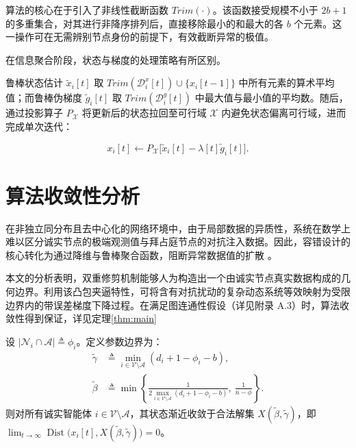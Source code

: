 算法的核心在于引入了非线性截断函数 $Trim(\cdot)$。该函数接受规模不小于 $2b+1$ 的多重集合，对其进行非降序排列后，直接移除最小的和最大的各 $b$ 个元素。这一操作可在无需辨别节点身份的前提下，有效截断异常的极值。

在信息聚合阶段，状态与梯度的处理策略有所区别。

鲁棒状态估计 $\widetilde{x}_i[t]$ 取 $Trim(\mathcal{D}_i^x[t]) \cup \{x_i[t-1]\}$ 中所有元素的算术平均值；而鲁棒伪梯度 $\widetilde{g}_i[t]$ 取 $Trim(\mathcal{D}_i^g[t])$ 中最大值与最小值的平均数。随后，通过投影算子 $P_{\mathcal{X}}$ 将更新后的状态拉回至可行域 $\mathcal{X}$ 内避免状态偏离可行域，进而完成单次迭代：

\begin{equation}
    x_i[t] \leftarrow P_{\mathcal{X}}\bigl[\widetilde{x}_i[t] - \lambda[t]\widetilde{g}_i[t]\bigr].
    \label{eq:update}
\end{equation}

\section{算法收敛性分析}

在非独立同分布且去中心化的网络环境中，由于局部数据的异质性，系统在数学上难以区分诚实节点的极端观测值与拜占庭节点的对抗注入数据。因此，容错设计的核心转化为通过降维与鲁棒聚合函数，阻断异常数据值的扩散 。

本文的分析表明，双重修剪机制能够人为构造出一个由诚实节点真实数据构成的几何边界。利用该凸包夹逼特性，可将含有对抗扰动的复杂动态系统等效映射为受限边界内的带误差梯度下降过程。在满足图连通性假设（详见附录 A.3）时，算法收敛性得到保证，详见定理\ref{thm:main}

\begin{theorem}
    设 $|\mathcal{N}_i\cap\mathcal{A}| \triangleq \phi_i$。定义参数边界为：
    \begin{align}
        \tilde{\gamma} &\triangleq \min_{i \in \mathcal{V} \setminus \mathcal{A}} (d_i + 1 - \phi_i - b), \\
        \tilde{\beta}  &\triangleq \min\left\{\frac{1}{2\max_{i \in \mathcal{V} \setminus \mathcal{A}}(d_i + 1 - \phi_i - b)},\ \frac{1}{n - \phi}\right\}.
    \end{align}
    则对所有诚实智能体 $i\in\mathcal{V}\setminus\mathcal{A}$，其状态渐近收敛于合法解集 $X(\widetilde{\beta}, \widetilde{\gamma})$，即 \\
    $\lim_{t\to\infty} \operatorname{Dist}\bigl(x_i[t], X(\widetilde{\beta}, \widetilde{\gamma})\bigr) = 0$。
    \label{thm:main}
\end{theorem}
